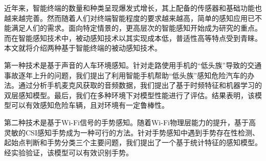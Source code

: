 \begin{cabstract}


近年来，智能终端的数量和种类呈现爆发式增长，其上配备的传感器和基础功能也越来越完善。然而随着人们对终端智能程度的要求越来越高，简单的感知应用已不能满足人们的需求。面向特定情景的，更高层次的智能感知开始成为研究的重点。而在智能感知技术中，被动感知技术以其实现成本低，普适性高等特点受到青睐。本文就将介绍两种基于智能终端的被动感知技术。

第一种技术是基于声音的人车环境感知。针对走路使用手机的“低头族”导致的交通事故逐年上升的问题，我们提出了利用智能手机帮助“低头族”感知危险汽车的办法。通过分析手机麦克风获取的音频数据，我们提出了基于时频特征和机器学习的双层感知模型。最后，我们在多种环境下对模型性能进行了评估。结果表明，该模型可以有效感知危险车辆，且对环境有一定鲁棒性。

第二种技术是基于Wi-Fi信号的手势感知。随着Wi-Fi物理层能力的提升，基于高灵敏的CSI感知手势成为一种可行的方法。针对手势感知中遇到手势存在性检测、起始点判断和手势分类三个主要问题，我们提出了一个基于统计特征的感知模型。经实验验证，该模型可以有效识别手势。

\end{cabstract}

